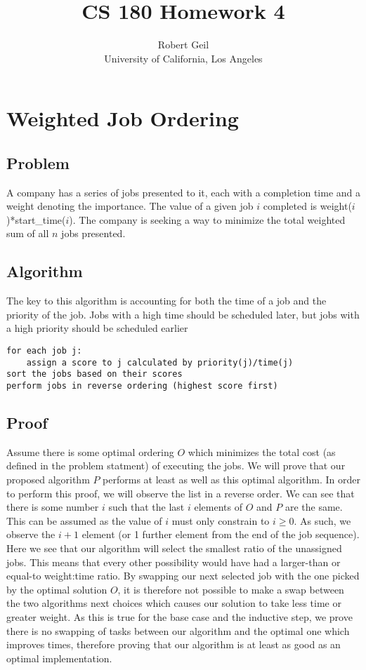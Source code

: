 \documentclass[titlepage]{article}
\title{CS 180 Homework 4}
\author{Robert Geil \\
University of California, Los Angeles
}
\numberwithin{equation}{subsection}
\begin{document}
\maketitle
\section{Weighted Job Ordering}
\subsection{Problem}
A company has a series of jobs presented to it, each with a completion time
and a weight denoting the importance. The value of a given job $i$ completed is
weight($i$)*start\_time($i$). The company is seeking a way to minimize the total
weighted sum of all $n$ jobs presented.
\subsection{Algorithm}
The key to this algorithm is accounting for both the time of a job and the priority
of the job. Jobs with a high time should be scheduled later, but jobs with a high
priority should be scheduled earlier
\begin{lstlisting}
for each job j:
    assign a score to j calculated by priority(j)/time(j)
sort the jobs based on their scores
perform jobs in reverse ordering (highest score first)
\end{lstlisting}
\subsection{Proof}
Assume there is some optimal ordering $O$ which minimizes the total cost (as defined in the 
problem statment) of executing the jobs. We will prove that our proposed algorithm $P$ performs at least
as well as this optimal algorithm. In order to perform this proof, we will observe the list in a reverse order.
We can see that there is some number $i$ such that the last $i$ elements of $O$ and $P$ are the same. 
This can be assumed as the value of $i$ must only constrain to $i\geq 0$. As such, we observe the 
$i+1$ element (or 1 further element from the end of the job sequence). Here we see that our algorithm
will select the smallest ratio of the unassigned jobs. This means that every other possibility would have
had a larger-than or equal-to weight:time ratio. By swapping our next selected job with the one picked by the
optimal solution $O$, it is therefore not possible to make a swap between the two algorithms next choices
which causes our solution to take less time or greater weight. As this is true for the base case and the
inductive step, we prove there is no swapping of tasks between our algorithm and the optimal one which
improves times, therefore proving that our algorithm is at least as good as an optimal implementation.
\end{document}
